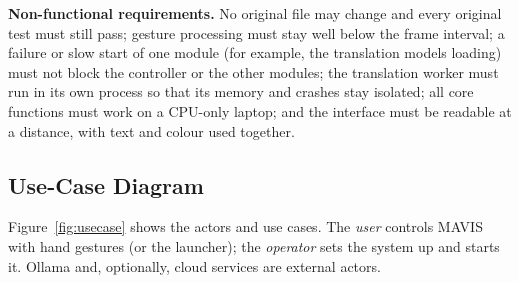 \documentclass[12pt,singleside,a4paper]{article}
\begin{document}
\noindent\textbf{Non-functional requirements.} No original file may change and every original test must still pass; gesture processing must stay well below the frame interval; a failure or slow start of one module (for example, the translation models loading) must not block the controller or the other modules; the translation worker must run in its own process so that its memory and crashes stay isolated; all core functions must work on a CPU-only laptop; and the interface must be readable at a distance, with text and colour used together.

\subsection{Use-Case Diagram}
Figure~\ref{fig:usecase} shows the actors and use cases. The \emph{user} controls MAVIS with hand gestures (or the launcher); the \emph{operator} sets the system up and starts it. Ollama and, optionally, cloud services are external actors.
\end{document}
